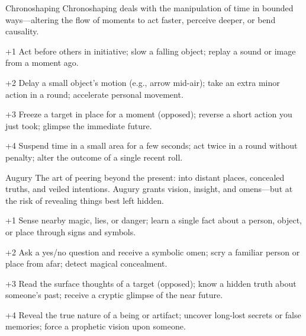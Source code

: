\begin{WyrdSpell}[Chronomancy]{Chronoshaping}
    Chronoshaping deals with the manipulation of time in bounded ways—altering the flow of moments to act faster, perceive deeper, or bend causality.

    \begin{WyrdSpellBlock}
        \item[+1] Act before others in initiative; slow a falling object; replay a sound or image from a moment ago.
        \item[+2] Delay a small object's motion (e.g., arrow mid-air); take an extra minor action in a round; accelerate personal movement.
        \item[+3] Freeze a target in place for a moment (opposed); reverse a short action you just took; glimpse the immediate future.
        \item[+4] Suspend time in a small area for a few seconds; act twice in a round without penalty; alter the outcome of a single recent roll.
    \end{WyrdSpellBlock}
\end{WyrdSpell}

\begin{WyrdSpell}[Divination]{Augury}
    The art of peering beyond the present: into distant places, concealed truths, and veiled intentions. Augury grants vision, insight, and omens—but at the risk of revealing things best left hidden.

    \begin{WyrdSpellBlock}
        \item[+1] Sense nearby magic, lies, or danger; learn a single fact about a person, object, or place through signs and symbols.
        \item[+2] Ask a yes/no question and receive a symbolic omen; scry a familiar person or place from afar; detect magical concealment.
        \item[+3] Read the surface thoughts of a target (opposed); know a hidden truth about someone’s past; receive a cryptic glimpse of the near future.
        \item[+4] Reveal the true nature of a being or artifact; uncover long-lost secrets or false memories; force a prophetic vision upon someone.
    \end{WyrdSpellBlock}
\end{WyrdSpell}

